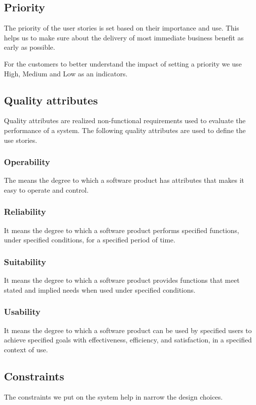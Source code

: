\documentclass[12pt, a4paper]{article}
\begin{document}
\subsection{Priority} 
The priority of the user stories is set based on their importance and use. This helps us to make sure about the delivery of most immediate business benefit as early as possible.

For the customers to better understand the impact of setting a priority we use High, Medium and Low as an indicators. 

\subsection{Quality attributes}  
Quality attributes are realized non-functional requirements used to evaluate the performance of a system. The following quality attributes are used to define the use stories.

\subsubsection{Operability}  
The means the degree to which a software product has attributes that makes it easy to operate and control.

\subsubsection{Reliability}
It means the degree to which a software product performs specified functions, under specified conditions, for a specified period of time.

\subsubsection{Suitability}
It means the degree to which a software product provides functions that meet stated and implied needs when used under specified conditions.

\subsubsection{Usability}
It means the degree to which a software product can be used by specified users to achieve specified goals with effectiveness, efficiency, and satisfaction, in a specified context of use.

\subsection{Constraints}
The constraints we put on the system help in narrow the design choices.
\end{document}
